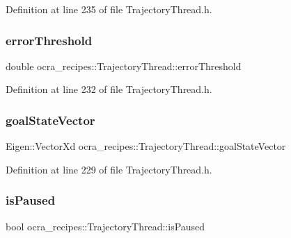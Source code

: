 Definition at line 235 of file Trajectory\+Thread.\+h.

\hypertarget{classocra__recipes_1_1TrajectoryThread_a69ca8ea525dd7529fbeae6d8bb9529b3}{}\label{classocra__recipes_1_1TrajectoryThread_a69ca8ea525dd7529fbeae6d8bb9529b3} 
\subsubsection{\texorpdfstring{error\+Threshold}{errorThreshold}}
{\footnotesize\ttfamily double ocra\+\_\+recipes\+::\+Trajectory\+Thread\+::error\+Threshold\hspace{0.3cm}{\ttfamily [protected]}}



Definition at line 232 of file Trajectory\+Thread.\+h.

\hypertarget{classocra__recipes_1_1TrajectoryThread_abb9ba9fef74e7336a325ad1183f4e090}{}\label{classocra__recipes_1_1TrajectoryThread_abb9ba9fef74e7336a325ad1183f4e090} 
\subsubsection{\texorpdfstring{goal\+State\+Vector}{goalStateVector}}
{\footnotesize\ttfamily Eigen\+::\+Vector\+Xd ocra\+\_\+recipes\+::\+Trajectory\+Thread\+::goal\+State\+Vector\hspace{0.3cm}{\ttfamily [protected]}}



Definition at line 229 of file Trajectory\+Thread.\+h.

\hypertarget{classocra__recipes_1_1TrajectoryThread_a08dc8a4a78b61d6b3d1e38e82b809493}{}\label{classocra__recipes_1_1TrajectoryThread_a08dc8a4a78b61d6b3d1e38e82b809493} 
\subsubsection{\texorpdfstring{is\+Paused}{isPaused}}
{\footnotesize\ttfamily bool ocra\+\_\+recipes\+::\+Trajectory\+Thread\+::is\+Paused\hspace{0.3cm}{\ttfamily [protected]}}



